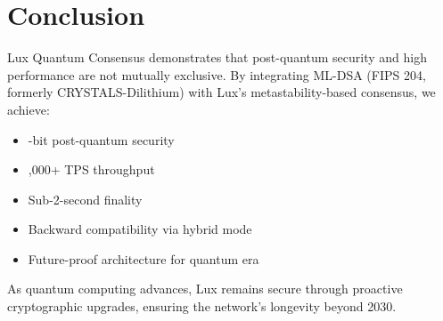 \section{Conclusion}


Lux Quantum Consensus demonstrates that post-quantum security and high performance are not mutually exclusive. By integrating ML-DSA (FIPS 204, formerly CRYSTALS-Dilithium) with Lux's metastability-based consensus, we achieve:

\begin{itemize}
    \item {}-bit post-quantum security
    \item {},000+ TPS throughput
    \item \checkmark Sub-2-second finality
    \item \checkmark Backward compatibility via hybrid mode
    \item \checkmark Future-proof architecture for quantum era
\end{itemize}

As quantum computing advances, Lux remains secure through proactive cryptographic upgrades, ensuring the network's longevity beyond 2030.

